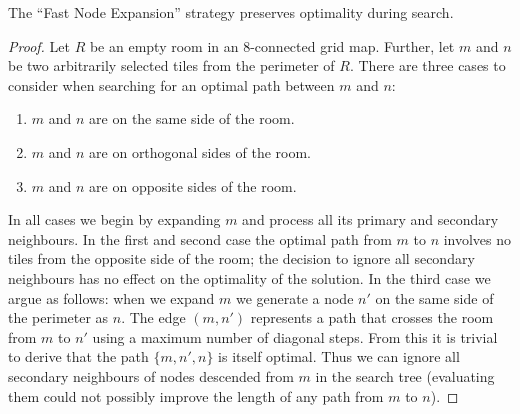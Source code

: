\begin{lemma}
The ``Fast Node Expansion'' strategy preserves optimality during search.
\end{lemma}
\begin{proof}
Let $R$ be an empty room in an 8-connected grid map.
Further, let $m$ and $n$ be two arbitrarily selected tiles from the perimeter of $R$.
There are three cases to consider when searching for an optimal path between $m$ and $n$:
\begin{enumerate}
\item{$m$ and $n$ are on the same side of the room.}
\item{$m$ and $n$ are on orthogonal sides of the room.}
\item{$m$ and $n$ are on opposite sides of the room.}
\end{enumerate}
In all cases we begin by expanding $m$ and process all its primary and secondary neighbours.
In the first and second case the optimal path from $m$ to $n$ involves no tiles from the opposite side of the room;
the decision to ignore all secondary neighbours has no effect on the optimality of the solution.
In the third case we argue as follows:
when we expand $m$ we generate a node $n'$ on the same side of the perimeter as $n$.
The edge $(m, n')$ represents a path that crosses the room from $m$ to $n'$
using a maximum number of diagonal steps. 
From this it is trivial to derive that the path $\lbrace m, n', n \rbrace$ is itself optimal.
Thus we can ignore all secondary neighbours of nodes descended from $m$ in the search tree
(evaluating them could not possibly improve the length of any path from $m$ to $n$).
\end{proof}



